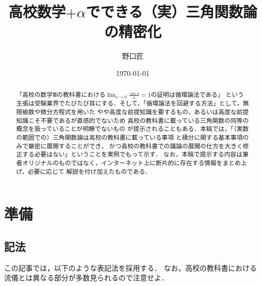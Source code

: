 \documentclass[11pt,a4paper]{ltjsarticle}
\title{高校数学$+\alpha$でできる（実）三角関数論の精密化}
\author{野口匠}
\affil{高知工科大学大学院工学研究科}
\date{\today}
\theoremstyle{definition}
\begin{document}
%
\maketitle

\begin{abstract}
  「高校の数学Ⅲの教科書における$\lim_{x \to 0} \frac{\sin x}{x} = 1$の証明は循環論法である」
  という主張は受験業界でたびたび耳にする．そして，「循環論法を回避する方法」として，無限級数や微分方程式を用いた
  やや高度な前提知識を要するもの，あるいは高度な前提知識こそ不要であるが直感的でないため
  高校の教科書に載っている三角関数の同等の概念を扱っていることが明瞭でないもの
  が提示されることもある．本稿では，「（実数の範囲での）三角関数論は高校の教科書に載っている事項
  と積分に関する基本事項のみで厳密に展開することができ，
  かつ高校の教科書での議論の展開の仕方を大きく修正する必要はない」ということを実例でもって示す．
  なお，本稿で提示する内容は筆者オリジナルのものではなく，インターネット上に断片的に存在する情報をまとめ上げ，必要に応じて
  解説を付け加えたものである．
\end{abstract}


\section{準備} \label{sec:pre}

\subsection{記法} \label{subsec:notation}

この記事では，以下のような表記法を採用する．
なお，高校の教科書における流儀とは異なる部分が多数見られるので注意せよ．
\end{document}
